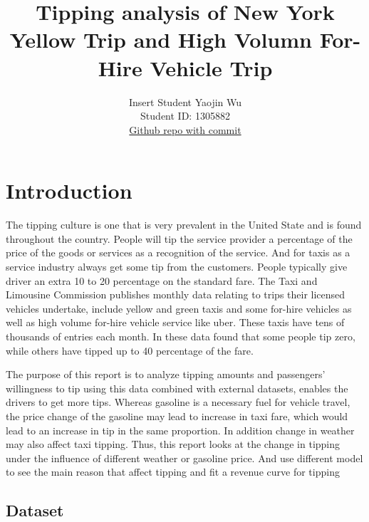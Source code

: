 \documentclass[11pt]{article}
\title{\textbf{Tipping analysis of New York Yellow Trip and High Volumn For-Hire Vehicle Trip} }
\author{
Insert Student Yaojin Wu \\
Student ID: 1305882\\
\href{https://github.com/MAST30034-AppliedDataScience/project-1-individual-WYJ-unimelb.git}{Github repo with commit}
}
\begin{document}
\maketitle

\section{Introduction}

The tipping culture is one that is very prevalent in the United State and is found throughout the country. People will tip the service provider a percentage 
of the price of the goods or services as a recognition of the service. And for taxis as a service industry always get some tip from the customers. People 
typically give driver an extra 10 to 20 percentage on the standard fare. The Taxi and Limousine Commission publishes monthly data relating to trips their 
licensed vehicles undertake, include yellow and green taxis and some for-hire vehicles as well as high volume for-hire vehicle service like uber. These 
taxis have tens of thousands of entries each month. In these data found that some people tip zero, while others have tipped up to 40 percentage of the fare. 

The purpose of this report is to analyze tipping amounts and passengers' willingness to tip using this data combined with external datasets, enables the drivers to get more tips. 
Whereas gasoline is a necessary fuel for vehicle
 travel, the price change of the gasoline may lead to increase in taxi fare, which would lead to an increase in tip in the same proportion. In addition 
 change in weather may also affect taxi tipping. Thus, this report looks at the change in tipping under the influence of different weather or gasoline price. 
 And use different model to see the main reason that affect tipping and fit a revenue curve for tipping 

\subsection{Dataset} 
\end{document}
